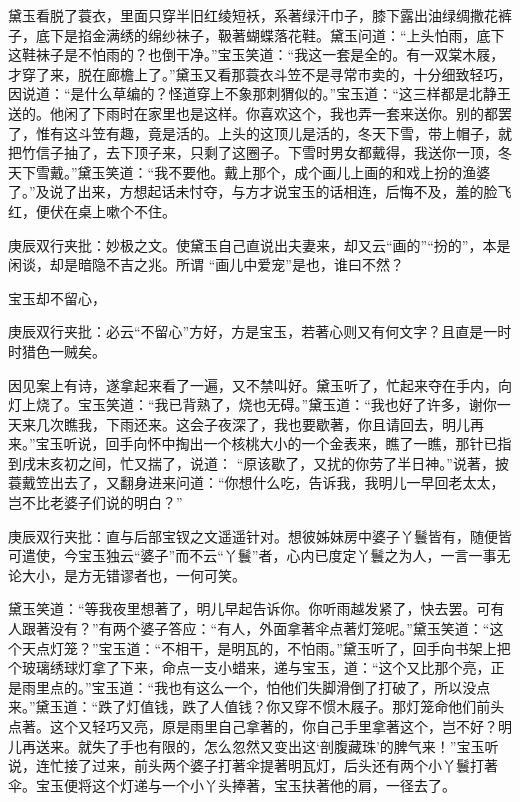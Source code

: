 \begin{parag}
    黛玉看脱了蓑衣，里面只穿半旧红绫短袄，系著绿汗巾子，膝下露出油绿绸撒花裤子，底下是掐金满绣的绵纱袜子，靸著蝴蝶落花鞋。黛玉问道：“上头怕雨，底下这鞋袜子是不怕雨的？也倒干净。”宝玉笑道：“我这一套是全的。有一双棠木屐，才穿了来，脱在廊檐上了。”黛玉又看那蓑衣斗笠不是寻常市卖的，十分细致轻巧，因说道：“是什么草编的？怪道穿上不象那刺猬似的。”宝玉道：“这三样都是北静王送的。他闲了下雨时在家里也是这样。你喜欢这个，我也弄一套来送你。别的都罢了，惟有这斗笠有趣，竟是活的。上头的这顶儿是活的，冬天下雪，带上帽子，就把竹信子抽了，去下顶子来，只剩了这圈子。下雪时男女都戴得，我送你一顶，冬天下雪戴。”黛玉笑道：“我不要他。戴上那个，成个画儿上画的和戏上扮的渔婆了。”及说了出来，方想起话未忖夺，与方才说宝玉的话相连，后悔不及，羞的脸飞红，便伏在桌上嗽个不住。\begin{note}庚辰双行夹批：妙极之文。使黛玉自己直说出夫妻来，却又云“画的”“扮的”，本是闲谈，却是暗隐不吉之兆。所谓 “画儿中爱宠”是也，谁曰不然？\end{note}
\end{parag}


\begin{parag}
    宝玉却不留心，\begin{note}庚辰双行夹批：必云“不留心”方好，方是宝玉，若著心则又有何文字？且直是一时时猎色一贼矣。\end{note}因见案上有诗，遂拿起来看了一遍，又不禁叫好。黛玉听了，忙起来夺在手内，向灯上烧了。宝玉笑道：“我已背熟了，烧也无碍。”黛玉道：“我也好了许多，谢你一天来几次瞧我，下雨还来。这会子夜深了，我也要歇著，你且请回去，明儿再来。”宝玉听说，回手向怀中掏出一个核桃大小的一个金表来，瞧了一瞧，那针已指到戌末亥初之间，忙又揣了，说道： “原该歇了，又扰的你劳了半日神。”说著，披蓑戴笠出去了，又翻身进来问道：“你想什么吃，告诉我，我明儿一早回老太太，岂不比老婆子们说的明白？”\begin{note}庚辰双行夹批：直与后部宝钗之文遥遥针对。想彼姊妹房中婆子丫鬟皆有，随便皆可遣使，今宝玉独云“婆子”而不云“丫鬟”者，心内已度定丫鬟之为人，一言一事无论大小，是方无错谬者也，一何可笑。\end{note}黛玉笑道：“等我夜里想著了，明儿早起告诉你。你听雨越发紧了，快去罢。可有人跟著没有？”有两个婆子答应：“有人，外面拿著伞点著灯笼呢。”黛玉笑道：“这个天点灯笼？”宝玉道：“不相干，是明瓦的，不怕雨。”黛玉听了，回手向书架上把个玻璃绣球灯拿了下来，命点一支小蜡来，递与宝玉，道：“这个又比那个亮，正是雨里点的。”宝玉道：“我也有这么一个，怕他们失脚滑倒了打破了，所以没点来。”黛玉道：“跌了灯值钱，跌了人值钱？你又穿不惯木屐子。那灯笼命他们前头点著。这个又轻巧又亮，原是雨里自己拿著的，你自己手里拿著这个，岂不好？明儿再送来。就失了手也有限的，怎么忽然又变出这‘剖腹藏珠’的脾气来！”宝玉听说，连忙接了过来，前头两个婆子打著伞提著明瓦灯，后头还有两个小丫鬟打著伞。宝玉便将这个灯递与一个小丫头捧著，宝玉扶著他的肩，一径去了。
\end{parag}


